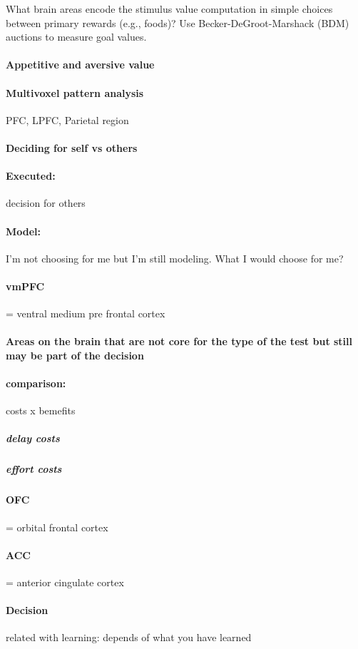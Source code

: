 \documentclass[12pt,article,oneside,a4paper]{memoir}
\begin{document}
What brain areas encode the stimulus value computation in simple choices between primary
rewards (e.g., foods)? Use Becker-DeGroot-Marshack (BDM) auctions to measure goal values.

\paragraph{Appetitive and aversive value}
\paragraph{Multivoxel pattern analysis} PFC, LPFC, Parietal region
\paragraph{Deciding for self vs others}
\paragraph{Executed:} decision for others
\paragraph{Model:} I'm not choosing for me but I'm still modeling. What I would choose for me?
\paragraph{vmPFC} = ventral medium pre frontal cortex
\paragraph{Areas on the brain that are not core for the type of the test but still may be part of the decision}
\paragraph{comparison:} costs x bemefits
\subparagraph{delay costs}
\subparagraph{effort costs}
\paragraph{OFC} = orbital frontal cortex
\paragraph{ACC} = anterior cingulate cortex

\paragraph{Decision} related with learning: depends of what you have learned
\end{document}
